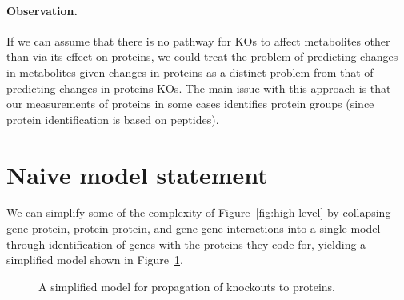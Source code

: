\documentclass{article}
\begin{document}
\paragraph{Observation.}
If we can assume that there is no pathway for KOs to affect metabolites other than via its effect on proteins, we could treat the problem of predicting changes in metabolites given changes in proteins as a distinct problem from that of predicting changes in proteins KOs.
The main issue with this approach is that our measurements of proteins in some cases identifies protein groups (since protein identification is based on peptides).

\section{Naive model statement}

We can simplify some of the complexity of Figure~\ref{fig:high-level} by collapsing gene-protein, protein-protein, and gene-gene interactions into a single model through identification of genes with the proteins they code for, yielding a simplified model shown in Figure~\ref{fig:simplified-proteins}.

\begin{figure}
\centering
{}
\caption{A simplified model for propagation of knockouts to proteins.}
\label{fig:simplified-proteins}
\end{figure}
\end{document}
